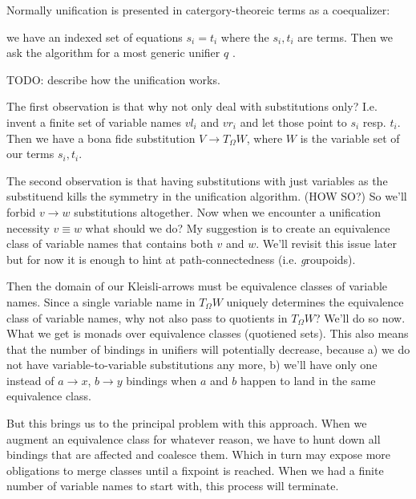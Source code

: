 Normally unification is presented in catergory-theoreic terms as a coequalizer:

we have an indexed set of equations $s_i = t_i$ where the ${s_i, t_i}$ are terms.
Then we ask the algorithm for a most generic unifier $q$ .

TODO: describe how the unification works.

The first observation is that why not only deal with substitutions only? I.e. invent a finite set of variable names $vl_i$ and $vr_i$ and let those point to $s_i$ resp. $t_i$. Then we have a bona fide substitution $V \to T_{\Omega}W$, where $W$ is the variable set of our terms ${s_i, t_i}$.

The second observation is that having substitutions with just variables as the substituend kills the symmetry in the unification algorithm. (HOW SO?) So we'll forbid $v \to w$ substitutions altogether. Now when we encounter a unification necessity $v \equiv w$ what should we do?
My suggestion is to create an equivalence class of variable names that contains both $v$ and $w$. We'll revisit this issue later but for now it is enough to hint at path-connectedness (i.e. \emph groupoids).

Then the domain of our Kleisli-arrows must be equivalence classes of variable names. Since a single variable name in $T_{\Omega}W$ uniquely determines the equivalence class of variable names, why not also pass to quotients in $T_{\Omega}W$?
We'll do so now. What we get is monads over equivalence classes (quotiened sets). This also means that the number of bindings in unifiers will potentially decrease, because \itemize
a) we do not have variable-to-variable substitutions any more,
b) we'll have only one instead of $a \to x$, $b \to y$ bindings when $a$ and $b$ happen to land in the same equivalence class.

But this brings us to the principal problem with this approach. When we augment an equivalence class for whatever reason, we have to hunt down all bindings that are affected and coalesce them. Which in turn may expose more obligations to merge classes until a fixpoint is reached. When we had a finite number of variable names to start with, this process will terminate.




